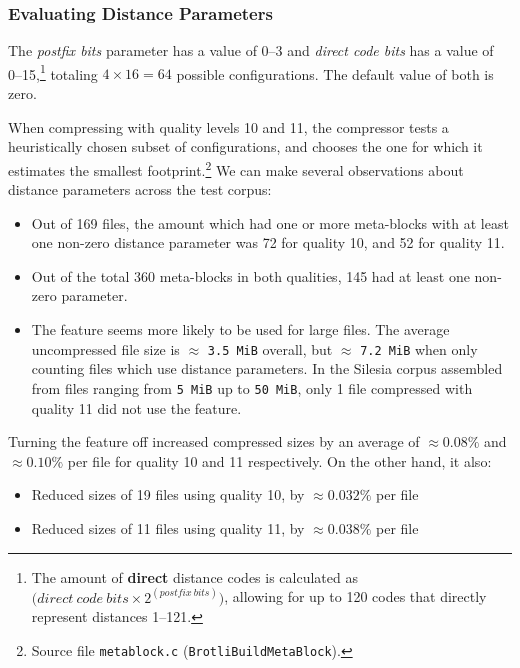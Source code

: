 \documentclass[english,master,dept460,male,cpp,cpdeclaration]{diploma}
\newcommand{\nosep}{\itemsep0em}
\begin{document}
		\subsubsection{Evaluating Distance Parameters}
		
		The \emph{postfix bits} parameter has a value of 0--3 and \emph{direct code bits} has a value of 0--15,\footnote{The amount of \textbf{direct} distance codes is calculated as $\big(direct\ code\ bits \times 2^{(postfix\ bits)}\big)$, allowing for up to 120 codes that directly represent distances 1--121.} totaling $4 \times 16 = 64$ possible configurations. The default value of both is zero.
		
		When compressing with quality levels 10 and 11, the compressor tests a heuristically chosen subset of configurations, and chooses the one for which it estimates the smallest footprint.\footnote{Source file \texttt{metablock.c} (\texttt{BrotliBuildMetaBlock}).} We can make several observations about distance parameters across the test corpus:
		
		\begin{itemize} \nosep
			\item Out of 169 files, the amount which had one or more meta-blocks with at least one non-zero distance parameter was 72 for quality 10, and 52 for quality 11.
			\item Out of the total 360 meta-blocks in both qualities, 145 had at least one non-zero parameter.
			\item The feature seems more likely to be used for large files. The average uncompressed file size is $\approx$ \verb|3.5 MiB| overall, but $\approx$ \verb|7.2 MiB| when only counting files which use distance parameters. In the Silesia corpus assembled from files ranging from \verb|5 MiB| up to \verb|50 MiB|, only 1 file compressed with quality 11 did not use the feature.
		\end{itemize}
		
		\noindent
		Turning the feature off increased compressed sizes by an average of $\approx 0.08 \%$ and $\approx 0.10 \%$ per file for quality 10 and 11 respectively. On the other hand, it also:
		
		\begin{itemize} \nosep
			\item Reduced sizes of 19 files using quality 10, by $\approx 0.032 \%$ per file
			\item Reduced sizes of 11 files using quality 11, by $\approx 0.038 \%$ per file
		\end{itemize}
		
\end{document}
